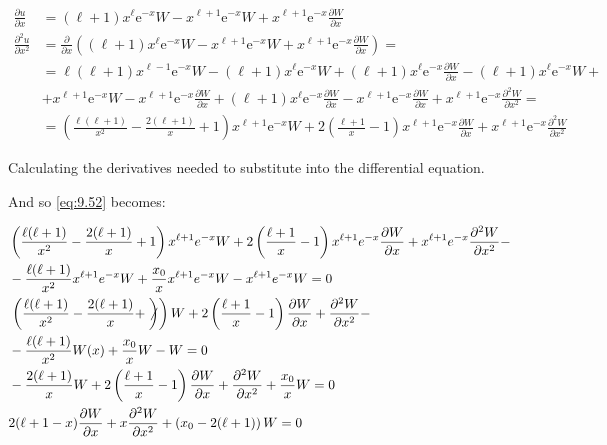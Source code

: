 \begin{align}
\frac{\partial u}{\partial x} & =(\ell+1) x^{\ell} \mathrm{e}^{-x} W-x^{\ell+1} \mathrm{e}^{-x} W+x^{\ell+1} \mathrm{e}^{-x} \frac{\partial W}{\partial x} \\
\frac{\partial^{2} u}{\partial x^{2}} & =\frac{\partial}{\partial x}\left((\ell+1) x^{\ell} \mathrm{e}^{-x} W-x^{\ell+1} \mathrm{e}^{-x} W+x^{\ell+1} \mathrm{e}^{-x} \frac{\partial W}{\partial x}\right)= \\
& =\ell(\ell+1) x^{\ell-1} \mathrm{e}^{-x} W-(\ell+1) x^{\ell} \mathrm{e}^{-x} W+(\ell+1) x^{\ell} \mathrm{e}^{-x} \frac{\partial W}{\partial x}-(\ell+1) x^{\ell} \mathrm{e}^{-x} W+ \\
& +x^{\ell+1} \mathrm{e}^{-x} W-x^{\ell+1} \mathrm{e}^{-x} \frac{\partial W}{\partial x}+(\ell+1) x^{\ell} \mathrm{e}^{-x} \frac{\partial W}{\partial x}-x^{\ell+1} \mathrm{e}^{-x} \frac{\partial W}{\partial x}+x^{\ell+1} \mathrm{e}^{-x} \frac{\partial^{2} W}{\partial x^{2}}= \\
& =\left(\frac{\ell(\ell+1)}{x^{2}}-\frac{2(\ell+1)}{x}+1\right) x^{\ell+1} \mathrm{e}^{-x} W+2\left(\frac{\ell+1}{x}-1\right) x^{\ell+1} \mathrm{e}^{-x} \frac{\partial W}{\partial x}+x^{\ell+1} \mathrm{e}^{-x} \frac{\partial^{2} W}{\partial x^{2}}
\end{align}

Calculating the derivatives needed to substitute into the differential equation.

And so \eqref{eq:9.52} becomes:

\begin{align}
& \left(\frac{\ell(\ell+1)}{x^{2}}-\frac{2(\ell+1)}{x}+1\right) x^{\ell+1} e^{-x} W+2\left(\frac{\ell+1}{x}-1\right) x^{\ell+1} e^{-x} \frac{\partial W}{\partial x}+x^{\ell+1} e^{-x} \frac{\partial^{2} W}{\partial x^{2}}- \\
& -\frac{\ell(\ell+1)}{x^{2}} x^{\ell+1} e^{-x} W+\frac{x_{0}}{x} x^{\ell+1} e^{-x} W-x^{\ell+1} e^{-x} W=0 \\
& \left.\left(\frac{\ell(\ell+1)}{x^{2}}-\frac{2(\ell+1)}{x}+\not\right)\right) W+2\left(\frac{\ell+1}{x}-1\right) \frac{\partial W}{\partial x}+\frac{\partial^{2} W}{\partial x^{2}}- \\
& -\frac{\ell(\ell+1)}{x^{2}} W(x)+\frac{x_{0}}{x} W- W = 0 \\
& -\frac{2(\ell+1)}{x} W+2\left(\frac{\ell+1}{x}-1\right) \frac{\partial W}{\partial x}+\frac{\partial^{2} W}{\partial x^{2}}+\frac{x_{0}}{x} W=0 \\
& 2(\ell+1-x) \frac{\partial W}{\partial x}+x \frac{\partial^{2} W}{\partial x^{2}}+\left(x_{0}-2(\ell+1)\right) W=0
\end{align}


